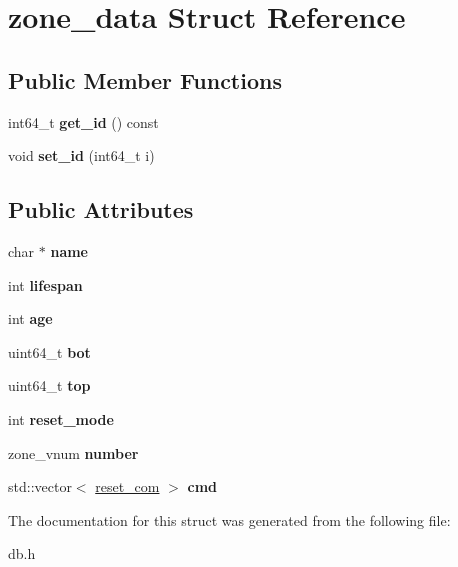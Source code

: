 \hypertarget{structzone__data}{}\section{zone\+\_\+data Struct Reference}
\label{structzone__data}
\subsection*{Public Member Functions}
\begin{DoxyCompactItemize}
\item 
\mbox{\label{structzone__data_a6120eecf2a6b6d52cc9df5f5a0a7dadc}} 
int64\+\_\+t {\bfseries get\+\_\+id} () const
\item 
\mbox{\label{structzone__data_a0895cca991f66be10e2728763f05875b}} 
void {\bfseries set\+\_\+id} (int64\+\_\+t i)
\end{DoxyCompactItemize}
\subsection*{Public Attributes}
\begin{DoxyCompactItemize}
\item 
\mbox{\label{structzone__data_aa44d6c4fc1b3364774fb67e528921049}} 
char $\ast$ {\bfseries name}
\item 
\mbox{\label{structzone__data_a394287a0eed95620a43f136591f9e625}} 
int {\bfseries lifespan}
\item 
\mbox{\label{structzone__data_a2bf69f347f8b44b42e9764adfae64c05}} 
int {\bfseries age}
\item 
\mbox{\label{structzone__data_a1c3fb2762c388e745672be1cd2d31388}} 
uint64\+\_\+t {\bfseries bot}
\item 
\mbox{\label{structzone__data_a7e7596ec5dc7ac35051346b91d579c4e}} 
uint64\+\_\+t {\bfseries top}
\item 
\mbox{\label{structzone__data_a7daf7b5ca0284906e38b1c34ee1fb00b}} 
int {\bfseries reset\+\_\+mode}
\item 
\mbox{\label{structzone__data_ab2377bd16aec8e968fd6b58ef3888030}} 
zone\+\_\+vnum {\bfseries number}
\item 
\mbox{\label{structzone__data_a0b8685c83baaaabeed4a98539365b9e1}} 
std\+::vector$<$ \hyperlink{structreset__com}{reset\+\_\+com} $>$ {\bfseries cmd}
\end{DoxyCompactItemize}


The documentation for this struct was generated from the following file\+:\begin{DoxyCompactItemize}
\item 
db.\+h\end{DoxyCompactItemize}
